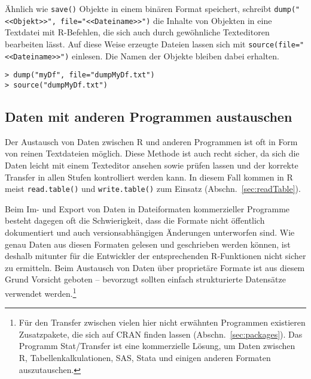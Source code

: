 Ähnlich wie \lstinline!save()! Objekte in einem binären Format speichert, schreibt \lstinline!dump("<<Objekt>>", file="<<Dateiname>>")! die Inhalte von Objekten in eine Textdatei mit R-Befehlen, die sich auch durch gewöhnliche Texteditoren bearbeiten lässt. Auf diese Weise erzeugte Dateien lassen sich mit \lstinline!source(file="<<Dateiname>>")! einlesen. Die Namen der Objekte bleiben dabei erhalten.
\begin{lstlisting}
> dump("myDf", file="dumpMyDf.txt")
> source("dumpMyDf.txt")
\end{lstlisting}

\subsection{Daten mit anderen Programmen austauschen}
\label{sec:dataExchange}

Der Austausch von Daten zwischen R und anderen Programmen ist oft in Form von reinen Textdateien möglich. Diese Methode ist auch recht sicher, da sich die Daten leicht mit einem Texteditor ansehen sowie prüfen lassen und der korrekte Transfer in allen Stufen kontrolliert werden kann. In diesem Fall kommen in R meist \lstinline!read.table()! und \lstinline!write.table()! zum Einsatz (Abschn.\ \ref{sec:readTable}).

Beim Im- und Export von Daten in Dateiformaten kommerzieller Programme besteht dagegen oft die Schwierigkeit, dass die Formate nicht öffentlich dokumentiert und auch versionsabhängigen Änderungen unterworfen sind. Wie genau Daten aus diesen Formaten gelesen und geschrieben werden können, ist deshalb mitunter für die Entwickler der entsprechenden R-Funktionen nicht sicher zu ermitteln. Beim Austausch von Daten über proprietäre Formate ist aus diesem Grund Vorsicht geboten -- bevorzugt sollten einfach strukturierte Datensätze verwendet werden.\footnote{Für den Transfer zwischen vielen hier nicht erwähnten Programmen existieren Zusatzpakete, die sich auf CRAN finden lassen (Abschn.\ \ref{sec:packages}). Das Programm Stat/Transfer \cite{CircleSystems2014} ist eine kommerzielle Lösung, um Daten zwischen R, Tabellenkalkulationen, SAS, Stata und einigen anderen Formaten auszutauschen.}


